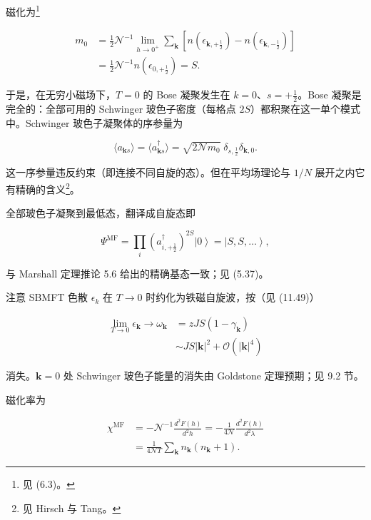 磁化为\footnote{见 (6.3)。}

\begin{align*}
m _ {0} & = \frac {1}{2} \mathcal {N} ^ {- 1} \lim_{h \to 0 ^ {+}} \sum_ {\mathbf {k}} \left[ n \left( \epsilon_{\mathbf {k}, + \frac {1}{2}} \right) - n \left( \epsilon_{\mathbf {k}, - \frac {1}{2}} \right) \right]\\
& = \frac {1}{2} \mathcal {N} ^ {- 1} n \left( \epsilon_{0, + \frac {1}{2}} \right) = S.
\tag{18.17}
\end{align*}

于是，在无穷小磁场下，$T=0$ 的 Bose 凝聚发生在 $k=0$、$s=+\frac{1}{2}$。Bose 凝聚是完全的：全部可用的 Schwinger 玻色子密度（每格点 $2S$）都积聚在这一单个模式中。Schwinger 玻色子凝聚体的序参量为

\begin{equation*}
\langle a _ {\mathbf {k} s} \rangle = \langle a _ {\mathbf {k} s} ^ {\dagger} \rangle = \sqrt {2 \mathcal {N} m _ {0}} \; \delta_{s, \frac {1}{2}} \delta_{\mathbf {k}, 0}.
\tag{18.18}
\end{equation*}

这一序参量违反约束（即连接不同自旋的态）。但在平均场理论与 $1/N$ 展开之内它有精确的含义\footnote{见 Hirsch 与 Tang。}。

全部玻色子凝聚到最低态，翻译成自旋态即

\begin{equation*}
\Psi^ {\mathrm{MF}} = \prod_ {i} \left( a _ {i, + \frac {1}{2}} ^ {\dagger} \right) ^ {2S} \left| 0 \right\rangle = \left| S, S, \ldots \right\rangle ,
\tag{18.19}
\end{equation*}

与 Marshall 定理推论 5.6 给出的精确基态一致；见 (5.37)。

注意 SBMFT 色散 $\epsilon_{k}$ 在 $T \rightarrow 0$ 时约化为铁磁自旋波，按（见 (11.49)）

\begin{align*}
\lim_{T \to 0} \epsilon_ {\mathbf {k}} \rightarrow \omega_ {\mathbf {k}} & = z J S \left( 1 - \gamma_ {\mathbf {k}} \right)\\
& \sim J S | \mathbf {k} | ^ {2} + \mathcal {O} \left( | \mathbf {k} | ^ {4} \right)
\tag{18.20}
\end{align*}

消失。$\mathbf{k} = 0$ 处 Schwinger 玻色子能量的消失由 Goldstone 定理预期；见 9.2 节。

磁化率为

\begin{align*}
\chi^ {\mathrm{MF}} & = - \mathcal {N} ^ {- 1} \frac {d ^ {2} F ( h )}{d ^ {2} h} = - \frac {1}{4 \mathcal {N}} \frac {d ^ {2} F ( h )}{d ^ {2} \lambda}\\
& = \frac {1}{4 \mathcal {N} T} \sum_ {\mathbf {k}} n _ {\mathbf {k}} \left( n _ {\mathbf {k}} + 1 \right) .
\tag{18.21}
\end{align*}

